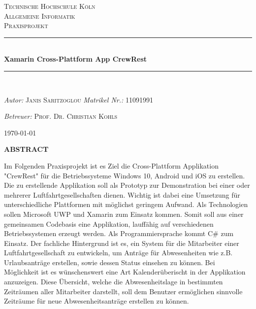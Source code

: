 \begin{titlepage}
\newcommand{\HRule}{\rule{\linewidth}{0.5mm}}
\center
\textsc{\LARGE Technische Hochschule Köln} \\[1.5cm]
\textsc{\Large Allgemeine Informatik} \\[0.5cm]
\textsc{\large Praxisprojekt} \\
\HRule  \\[0.4cm]
{ \huge \bfseries Xamarin Cross-Plattform App CrewRest} \\[0.4cm]
\HRule  \\[1.5cm]
\vfill
\begin{minipage}[t]{0.4\textwidth}
    \begin{flushleft} \large
        \emph{Autor:} \newline
        \textsc{Janis Saritzoglou}
        \newline
        \emph{Matrikel Nr.:}
        \textsc{11091991}
    \end{flushleft}
\end{minipage}
\hfill
\begin{minipage}[t]{0.5\textwidth}
    \begin{flushright} \large
        \begin{flushleft}
            \emph{Betreuer:} \newline
            \textsc{Prof. Dr. Christian Kohls}
    \end{flushleft}
    \end{flushright}
\end{minipage}
\vfill
{\large \today}
\end{titlepage}
\begin{center} \textbf{\uppercase{abstract}} \end{center}
Im Folgenden Praxisprojekt ist es Ziel die Cross-Plattform Applikation "CrewRest" für die Betriebssysteme Windows 10, Android und iOS zu erstellen. Die zu erstellende Applikation soll als Prototyp zur Demonstration bei einer oder mehrerer Luftfahrtgesellschaften dienen. Wichtig ist dabei eine Umsetzung für unterschiedliche Plattformen mit möglichst geringem Aufwand. Als Technologien sollen Microsoft UWP und Xamarin zum Einsatz kommen. Somit soll aus einer gemeinsamen Codebasis eine Applikation, lauffähig auf verschiedenen Betriebssystemen erzeugt werden. Als Programmiersprache kommt C\# zum Einsatz. Der fachliche Hintergrund ist es, ein System für die Mitarbeiter einer Luftfahrtgesellschaft zu entwickeln, um Anträge für Abwesenheiten wie z.B. Urlaubsanträge erstellen, sowie dessen Status einsehen zu können. Bei Möglichkeit ist es wünschenswert eine Art Kalenderüberischt in der Applikation anzuzeigen. Diese Übersicht, welche die Abwesenheitslage in bestimmten Zeiträumen aller Mitarbeiter darstellt, soll dem Benutzer ermöglichen sinnvolle Zeiträume für neue Abwesenheitsanträge erstellen zu können.
